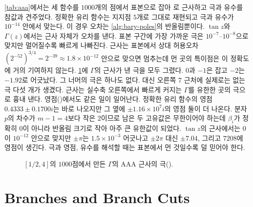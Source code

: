 \cref{tab:aaa}에서는 세 함수를 $1000$개의 점에서 표본으로 잡아 로 근사하고 극과 유수를 참값과 견주었다. 정확한 유리 함수는 지지점 $5$개로 그대로 재현되고 극과 유수가 $10^{-14}$ 안에서 맞는다. 이 경우 오차는 \cref{alg:bary-poles}의 반올림뿐이다. $\tan z$와 $\Gamma(z)$에서는 근사 자체가 오차를 낸다. 표본 구간에 가장 가까운 극은 $10^{-7}$--$10^{-8}$으로 맞지만 멀어질수록 빠르게 나빠진다. 근사는 표본에서 상대 허용오차 $(2^{-52})^{3/4}=2^{-39}\approx1.8\times10^{-12}$ 안으로 맞으면 멈추는데 먼 곳의 특이점은 이 정확도에 거의 기여하지 않는다. \cref{fig:aaa-poles}에 $\Gamma$의 근사가 낸 극을 모두 그렸다. $0$과 $-1$은 잡고 $-2$는 $-1.92$로 어긋났다. 그 너머의 극은 하나도 없다. 대신 오른쪽 $7$ 근처에 실제로는 없는 극 다섯 개가 생겼다. 근사는 실수축 오른쪽에서 빠르게 커지는 $\Gamma$를 유한한 곳의 극으로 흉내 낸다. 영점()에서도 같은 일이 일어난다. 정확한 유리 함수의 영점 $0.4333\pm0.1700i$는 바로 나오지만 그 옆에 $\pm1.16\times10^7i$의 영점 둘이 더 나온다. 분자 $p$의 차수가 $m-1=4$보다 작은 $2$이므로 남은 두 고유값은 무한이어야 하는데 $\beta_i$가 정확히 $0$이 아니라 반올림 크기로 작아 아주 큰 유한값이 되었다. $\tan z$의 근사에서는 $0$이 $10^{-12}$ 안으로 맞지만 $\pm\pi$는 $1.5\times10^{-3}$ 어긋나고 $\pm2\pi$ 대신 $\pm7.04$, 그리고 $7208$에 영점이 생긴다. 극과 영점, 유수를 해석할 때는 표본에서 먼 것일수록 덜 믿어야 한다.

\begin{figure}[htbp]
\centering
{}
\caption{$[1/2,4]$의 $1000$점에서 만든 $\Gamma$의 AAA 근사의 극().}
\label{fig:aaa-poles}
\end{figure}


\section{Branches and Branch Cuts}
\label{sec:branches}

